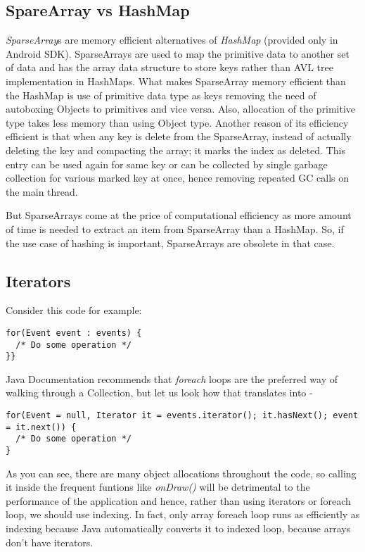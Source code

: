 \documentclass[journal]{IEEEtran}
\begin{document}
\subsection{SpareArray vs HashMap}
\emph{SparseArray}s are memory efficient alternatives of \emph{HashMap} (provided only in Android SDK). SparseArrays are used to map the primitive data to another set of data and has the array data structure to store keys rather than AVL tree implementation in HashMaps. What makes SparseArray memory efficient than the HashMap is use of primitive data type as keys removing the need of autoboxing Objects to primitives and vice versa. Also, allocation of the primitive type takes less memory than using Object type. Another reason of its efficiency efficient is that when any key is delete from the SparseArray, instead of actually deleting the key and compacting the array; it marks the index as deleted. This entry can be used again for same key or can be collected by single garbage collection for various marked key at once, hence removing repeated GC calls on the main thread.

But SparseArrays come at the price of computational efficiency as more amount of time is needed to extract an item from SparseArray than a HashMap. So, if the use case of hashing is important, SparseArrays are obsolete in that case.

\subsection{Iterators}
Consider this code for example:
\begin{verbatim}
for(Event event : events) {
  /* Do some operation */
}}
\end{verbatim}

Java Documentation recommends that \textit{foreach} loops are the preferred way of walking through a Collection, but let us look how that translates into -
\begin{verbatim}
for(Event = null, Iterator it = events.iterator(); it.hasNext(); event = it.next()) {
  /* Do some operation */
}
\end{verbatim}
As you can see, there are many object allocations throughout the code, so calling it inside the frequent funtions like \textit{onDraw()} will be detrimental to the performance of the application and hence, rather than using iterators or foreach loop, we should use indexing. In fact, only array foreach loop runs as efficiently as indexing because Java automatically converts it to indexed loop, because arrays don't have iterators.
\end{document}

